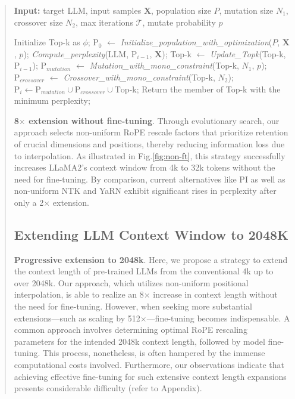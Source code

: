 \begin{abstract}
\begin{algorithm}[t]
	\small
	\caption{The search algorithm}
	\textbf{Input:} target LLM, input samples $\mathbf{X}$,   population size $P$, mutation size $N_1$, crossover size $N_2$, max iterations $\mathcal{T}$, mutate probability $p$\\

	\begin{algorithmic}[1]
		\label{alg:search}
		\STATE Initialize Top-k as $\phi$;	
		\STATE $\text{P}_0$ $\gets$ \textit{Initialize\_population\_with\_optimization}($P$, $\mathbf{X}$, $p$); 
		\STATE \textit{Compute\_perplexity}(LLM, $\text{P}_{i-1}$, $\mathbf{X}$);
		\STATE Top-k $\gets$ \textit{Update\_Topk}(Top-k, $\text{P}_{i-1}$);
		\STATE $\text{P}_{mutation}$ $\gets$ \textit{Mutation\_with\_mono\_constraint}(Top-k, $N_1$, $p$); 
		\STATE $\text{P}_{crossover}$ $\gets$ \textit{Crossover\_with\_mono\_constraint}(Top-k, $N_2$);
		\STATE $\text{P}_i \gets \text{P}_{mutation} \cup \text{P}_{crossover} \cup \text{Top-k}$;
		\ENDFOR
		\STATE Return the member of Top-k with the minimum perplexity;
	\end{algorithmic}
\end{algorithm}

\textbf{8$\times$ extension without fine-tuning}. Through evolutionary search, our approach selects non-uniform RoPE rescale factors that prioritize retention of crucial dimensions and positions, thereby reducing information loss due to interpolation. As illustrated in Fig.\ref{fig:non-ft}, this strategy successfully increases LLaMA2's context window from 4k to 32k tokens without the need for fine-tuning. By comparison, current alternatives like PI as well as non-uniform NTK and YaRN exhibit significant rises in perplexity after only a 2$\times$ extension.

\subsection{Extending LLM Context Window to 2048K}
\label{sec:extendto2048k}

\textbf{Progressive extension to 2048k}. Here, we propose a strategy to extend the context length of pre-trained LLMs from the conventional 4k up to over 2048k. Our approach, which utilizes non-uniform positional interpolation, is able to realize an 8$\times$ increase in context length without the need for fine-tuning. However, when seeking more substantial extensions—such as scaling by 512$\times$—fine-tuning becomes indispensable. A common approach involves determining optimal RoPE rescaling parameters for the intended 2048k context length, followed by model fine-tuning. This process, nonetheless, is often hampered by the immense computational costs involved. Furthermore, our observations indicate that achieving effective fine-tuning for such extensive context length expansions presents considerable difficulty (refer to Appendix).


\end{abstract}
